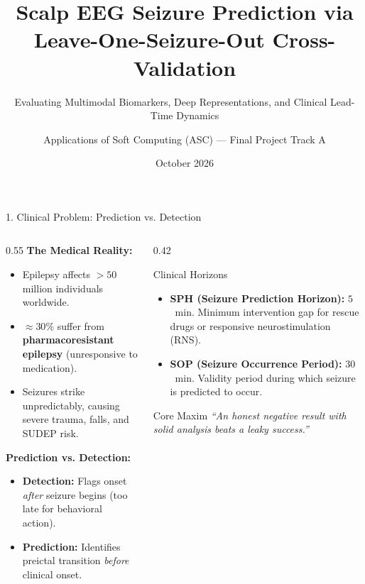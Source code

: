 \documentclass[aspectratio=169,10pt]{beamer}
\title[ASC Track A --- EEG Seizure Prediction]{Scalp EEG Seizure Prediction via Leave-One-Seizure-Out Cross-Validation}
\subtitle{Evaluating Multimodal Biomarkers, Deep Representations, and Clinical Lead-Time Dynamics}
\author[Applications of Soft Computing]{Applications of Soft Computing (ASC) --- Final Project Track A}
\institute[Master AI / DS]{Machine Learning Block --- Academic Year 2026--2027}
\date{October 2026}
\begin{document}
\begin{frame}
  \titlepage
\end{frame}

\begin{frame}{1. Clinical Problem: Prediction vs. Detection}
\begin{columns}[T]
\begin{column}{0.55\textwidth}
\textbf{The Medical Reality:}
\begin{itemize}
    \item Epilepsy affects $>50$ million individuals worldwide.
    \item $\approx 30\%$ suffer from \textbf{pharmacoresistant epilepsy} (unresponsive to medication).
    \item Seizures strike unpredictably, causing severe trauma, falls, and SUDEP risk.
\end{itemize}

\vspace{0.3cm}
\textbf{Prediction vs. Detection:}
\begin{itemize}
    \item \textbf{Detection:} Flags onset \emph{after} seizure begins (too late for behavioral action).
    \item \textbf{Prediction:} Identifies preictal transition \emph{before} clinical onset.
\end{itemize}
\end{column}

\begin{column}{0.42\textwidth}
\begin{block}{Clinical Horizons}
\begin{itemize}
    \item \textbf{SPH (Seizure Prediction Horizon):} $5$~min. Minimum intervention gap for rescue drugs or responsive neurostimulation (RNS).
    \item \textbf{SOP (Seizure Occurrence Period):} $30$~min. Validity period during which seizure is predicted to occur.
\end{itemize}
\end{block}

\begin{alertblock}{Core Maxim}
\emph{``An honest negative result with solid analysis beats a leaky success.''}
\end{alertblock}
\end{column}
\end{columns}
\end{frame}
\end{document}
